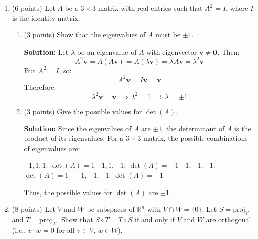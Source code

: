 \documentclass[12pt]{article}
\newcommand{\qspace}{\vspace{1em}} %
\newenvironment{solution}{\noindent\textbf{Solution:} }{\qspace}
\begin{document}
\begin{enumerate}
\begin{solution}
    \textbf{Eigenvalues:} All possible sums \( \lambda_i + \lambda_j \) for \( 1 \leq i, j \leq n \).

    \textbf{Eigenvectors:} The standard basis matrices \( E_{ij} \).

    \textbf{Multiplicity:} The multiplicity of each eigenvalue \( \lambda_i + \lambda_j \) corresponds to the number of pairs \( (i, j) \) that satisfy \( \lambda_i + \lambda_j \).
    \end{solution}
    
    \item (6 points) Let \( A \) be a \( 3 \times 3 \) matrix with real entries such that \( A^2 = I \), where \( I \) is the identity matrix.
    \begin{enumerate}
        \item (3 points) Show that the eigenvalues of \( A \) must be \( \pm 1 \).
        
        \begin{solution}
        Let \( \lambda \) be an eigenvalue of \( A \) with eigenvector \( \mathbf{v} \neq \mathbf{0} \). Then:
        \[
        A^2 \mathbf{v} = A(A\mathbf{v}) = A(\lambda \mathbf{v}) = \lambda A \mathbf{v} = \lambda^2 \mathbf{v}
        \]
        But \( A^2 = I \), so:
        \[
        A^2 \mathbf{v} = I \mathbf{v} = \mathbf{v}
        \]
        Therefore:
        \[
        \lambda^2 \mathbf{v} = \mathbf{v} \implies \lambda^2 = 1 \implies \lambda = \pm 1
        \]
        \end{solution}
        
        \item (3 points) Give the possible values for \( \det(A) \).
        
        \begin{solution}
        Since the eigenvalues of \( A \) are \( \pm 1 \), the determinant of \( A \) is the product of its eigenvalues. For a \( 3 \times 3 \) matrix, the possible combinations of eigenvalues are:

        - \( 1, 1, 1 \): \( \det(A) = 1 \)
        - \( 1, 1, -1 \): \( \det(A) = -1 \)
        - \( 1, -1, -1 \): \( \det(A) = 1 \)
        - \( -1, -1, -1 \): \( \det(A) = -1 \)

        Thus, the possible values for \( \det(A) \) are \( \pm 1 \).
        \end{solution}
    \end{enumerate}
    
    \item (8 points) Let \( V \) and \( W \) be subspaces of \( \mathbb{R}^n \) with \( V \cap W = \{0\} \). Let \( S = \text{proj}_V \) and \( T = \text{proj}_W \). Show that \( S \circ T = T \circ S \) if and only if \( V \) and \( W \) are orthogonal (i.e., \( v \cdot w = 0 \) for all \( v \in V \), \( w \in W \)). 
        

\end{enumerate}
\end{document}
